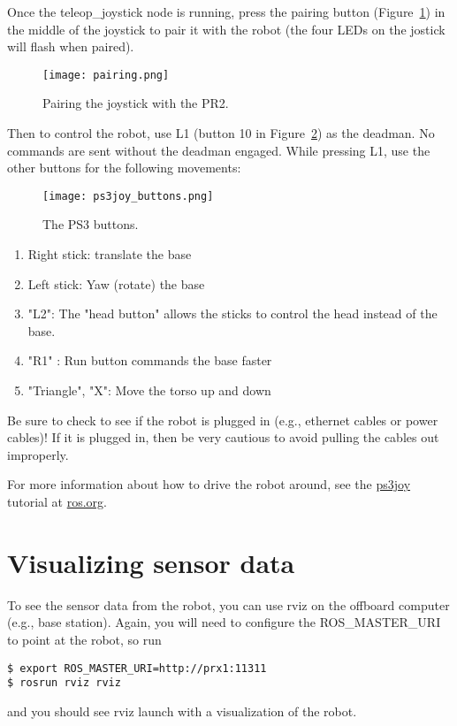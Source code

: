 Once the teleop\_joystick node is running, press the pairing button (Figure~\ref{fig:ps3_pairing}) in the middle of the 
joystick to pair it with the robot (the four LEDs on the jostick will flash when paired). 
\begin{figure}[H]
\centering
\texttt{[image: pairing.png]}
\caption{Pairing the joystick with the PR2.}
\label{fig:ps3_pairing}
\end{figure}
Then to control the robot, use L1 (button 10 in Figure~\ref{fig:buttons}) as the deadman.
No commands are sent without the deadman engaged.
While pressing L1, use the other buttons for the following movements:
\begin{figure}[H]
\centering
\texttt{[image: ps3joy\_buttons.png]}
\caption{The PS3 buttons.}
\label{fig:buttons}
\end{figure}
\begin{enumerate}
\item Right stick: translate the base
\item Left stick: Yaw (rotate) the base
\item "L2": The "head button" allows the sticks to control the head instead of the base.
\item "R1" : Run button commands the base faster
\item "Triangle", "X": Move the torso up and down 
\end{enumerate}


Be sure to check to see if the robot is plugged in (e.g., ethernet cables or power cables)! If it is plugged in, then be very cautious to avoid pulling the cables out improperly.

For more information about how to drive the robot around, see the 
\href{http://www.ros.org/wiki/ps3joy/Tutorials/UsingJoystickWithPR2}{ps3joy} tutorial at \href{http://www.ros.org}{ros.org}. 

\section{Visualizing sensor data}
To see the sensor data from the robot, you can use rviz on the offboard computer (e.g., base station).  Again, you will 
need to configure the ROS\_MASTER\_URI to point at the robot, so run
\begin{verbatim}
$ export ROS_MASTER_URI=http://prx1:11311
$ rosrun rviz rviz
\end{verbatim}
and you should see rviz launch with a visualization of the robot.  

